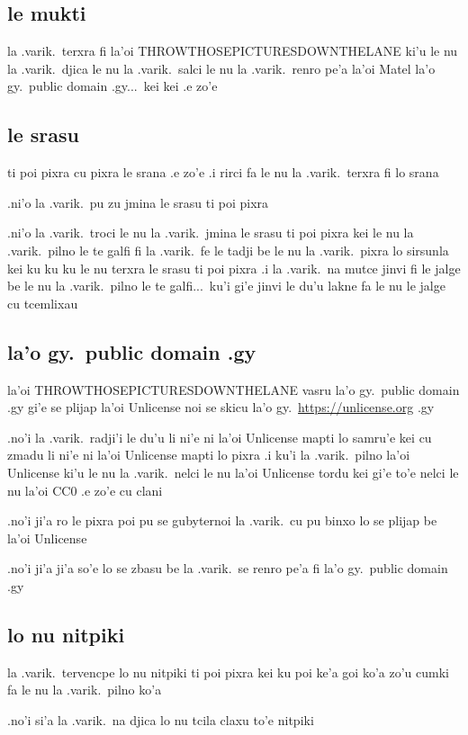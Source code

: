 \documentclass{report}
\begin{document}
\subsection{le mukti}
la .varik.\ terxra fi la'oi THROWTHOSEPICTURESDOWNTHELANE ki'u le nu la .varik.\ djica le nu la .varik.\ salci le nu la .varik.\ renro pe'a la'oi Matel la'o gy.\ public domain .gy...\ kei kei .e zo'e

\subsection{le srasu}
ti poi pixra cu pixra le srana .e zo'e  .i rirci fa le nu la .varik.\ terxra fi lo srana

.ni'o la .varik.\ pu zu jmina le srasu ti poi pixra

.ni'o la .varik.\ troci le nu la .varik.\ jmina le srasu ti poi pixra kei le nu la .varik.\ pilno le te galfi fi la .varik.\ fe le tadji be le nu la .varik.\ pixra lo sirsunla kei ku ku ku le nu terxra le srasu ti poi pixra  .i la .varik.\ na mutce jinvi fi le jalge be le nu la .varik.\ pilno le te galfi...\ ku'i gi'e jinvi le du'u lakne fa le nu le jalge cu tcemlixau

\subsection{la'o gy.\ public domain .gy}
la'oi THROWTHOSEPICTURESDOWNTHELANE vasru la'o gy.\ public domain .gy gi'e se plijap la'oi Unlicense noi se skicu la'o gy.\ \url{https://unlicense.org} .gy

.no'i la .varik.\ radji'i le du'u li ni'e ni la'oi Unlicense mapti lo samru'e kei cu zmadu li ni'e ni la'oi Unlicense mapti lo pixra  .i ku'i la .varik.\ pilno la'oi Unlicense ki'u le nu la .varik.\ nelci le nu la'oi Unlicense tordu kei gi'e to'e nelci le nu la'oi CC0 .e zo'e cu clani

.no'i ji'a ro le pixra poi pu se gubyternoi la .varik.\ cu pu binxo lo se plijap be la'oi Unlicense

.no'i ji'a ji'a so'e lo se zbasu be la .varik.\ se renro pe'a fi la'o gy.\ public domain .gy

\subsection{lo nu nitpiki}
la .varik.\ tervencpe lo nu nitpiki ti poi pixra kei ku poi ke'a goi ko'a zo'u cumki fa le nu la .varik.\ pilno ko'a

.no'i si'a la .varik.\ na djica lo nu tcila claxu to'e nitpiki
\end{document}
